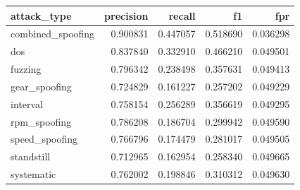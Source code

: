 \begin{tabular}{lrrrr}
\toprule
attack_type & precision & recall & f1 & fpr \\
\midrule
combined_spoofing & 0.900831 & 0.447057 & 0.518690 & 0.036298 \\
dos & 0.837840 & 0.332910 & 0.466210 & 0.049501 \\
fuzzing & 0.796342 & 0.238498 & 0.357631 & 0.049413 \\
gear_spoofing & 0.724829 & 0.161227 & 0.257202 & 0.049229 \\
interval & 0.758154 & 0.256289 & 0.356619 & 0.049295 \\
rpm_spoofing & 0.786208 & 0.186704 & 0.299942 & 0.049590 \\
speed_spoofing & 0.766796 & 0.174479 & 0.281017 & 0.049505 \\
standstill & 0.712965 & 0.162954 & 0.258340 & 0.049665 \\
systematic & 0.762002 & 0.198846 & 0.310312 & 0.049630 \\
\bottomrule
\end{tabular}
